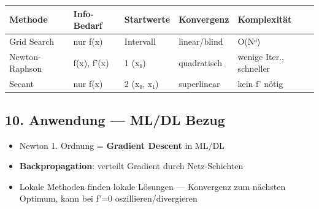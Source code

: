 \documentclass[11pt, a4paper]{article}
\begin{document}
{\small
\begin{tabularx}{\linewidth}{XXXXX}
\hline
\rowcolor{tableheadbg}
{\color{white}\textbf{Methode}} & {\color{white}\textbf{Info-Bedarf}} & {\color{white}\textbf{Startwerte}} & {\color{white}\textbf{Konvergenz}} & {\color{white}\textbf{Komplexität}} \\[2pt]
\hline
\endhead
\hline
\endfoot
Grid Search & nur f(x) & Intervall & linear/blind & O(Nᵈ) \\
Newton-Raphson & f(x), f'(x) & 1 (x₀) & quadratisch & wenige Iter., schneller \\
Secant & nur f(x) & 2 (x₀, x₁) & superlinear & kein f' nötig \\
\end{tabularx}
}



\subsection{10. Anwendung — ML/DL Bezug}

\begin{itemize}
  \item Newton 1. Ordnung = \textbf{Gradient Descent} in ML/DL
  \item \textbf{Backpropagation}: verteilt Gradient durch Netz-Schichten
  \item Lokale Methoden finden lokale Lösungen — Konvergenz zum nächsten Optimum, kann bei f'=0 oszillieren/divergieren
\end{itemize}




\end{document}
